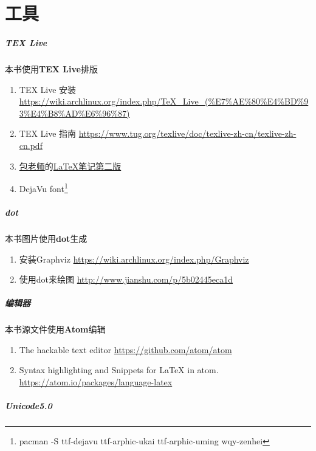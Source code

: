 \chapter{工具}

\paragraph{TEX Live}
本书使用\textbf{TEX Live}排版
\begin{enumerate}
  \item TEX Live 安装 \url{https://wiki.archlinux.org/index.php/TeX_Live_(%E7%AE%80%E4%BD%93%E4%B8%AD%E6%96%87)}
  \item TEX Live 指南 \url{https://www.tug.org/texlive/doc/texlive-zh-cn/texlive-zh-cn.pdf}
  \item \href{http://www.dralpha.com/zh/index.htm}{包老师}的\href{http://dralpha.altervista.org/zh/tech/lnotes2.pdf}{LaTeX笔记第二版}  
  \item DejaVu font\footnote{pacman -S ttf-dejavu ttf-arphic-ukai ttf-arphic-uming wqy-zenhei}
\end{enumerate}

\paragraph{dot}
本书图片使用\textbf{dot}生成
\begin{enumerate}
  \item 安装Graphviz \url{https://wiki.archlinux.org/index.php/Graphviz}
  \item 使用dot来绘图 \url{http://www.jianshu.com/p/5b02445eca1d}
\end{enumerate}

\paragraph{编辑器}
本书源文件使用\textbf{Atom}编辑
\begin{enumerate}
  \item The hackable text editor \url{https://github.com/atom/atom}
  \item Syntax highlighting and Snippets for LaTeX in atom. \url{https://atom.io/packages/language-latex}
\end{enumerate}

\paragraph{Unicode5.0}

